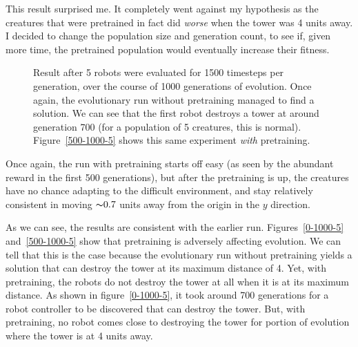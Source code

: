 \documentclass[12pt, a4paper]{article}
\begin{document}
This result surprised me. It completely went against my hypothesis as the creatures that were pretrained in fact did \emph{worse} when the tower was 4 units away. I decided to change the population size and generation count, to see if, given more time, the pretrained population would eventually increase their fitness.
\begin{figure}[ht]
\centering
{}
\quad
{}
	\caption{Result after 5 robots were evaluated for 1500 timesteps per generation, over the course of 1000 generations of evolution.  Once again, the evolutionary run without pretraining managed to find a solution. We can see that the first robot destroys a tower at around generation 700 (for a population of 5 creatures, this is normal). Figure~\ref{500-1000-5} shows this same experiment \emph{with} pretraining.}
\end{figure}
Once again, the run with pretraining starts off easy (as seen by the abundant reward in the first 500 generations), but after the pretraining is up, the creatures have no chance adapting to the difficult environment, and stay relatively consistent in moving ${\thicksim}0.7$ units away from the origin in the $y$ direction. 

As we can see, the results are consistent with the earlier run. Figures~\ref{0-1000-5} and~\ref{500-1000-5} show that pretraining is adversely affecting evolution. We can tell that this is the case because the evolutionary run without pretraining yields a solution that can destroy the tower at its maximum distance of 4. Yet, with pretraining, the robots do not destroy the tower at all when it is at its maximum distance. As shown in figure~\ref{0-1000-5}, it took around 700 generations for a robot controller to be discovered that can destroy the tower. But, with pretraining, no robot comes close to destroying the tower for portion of evolution where the tower is at 4 units away.
\end{document}
